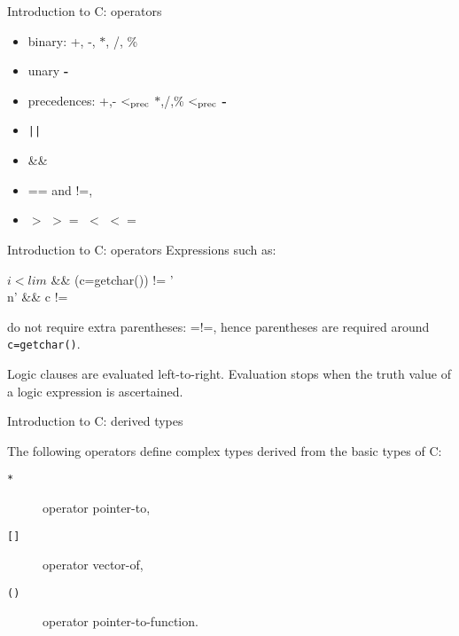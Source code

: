 \begin{frame}[fragile]{Introduction to C: operators}
\begin{itemize}
\item binary: +, -, $\ast$, /, \%
\item unary {\bf -}
\item precedences: +,- $<_{\rm prec}$ $\ast$,/,\% $<_{\rm prec}$ {\bf -}
\end{itemize}


\vspace{20pt}

\begin{itemize}
\item {\tt ||} \pre
\item \&\& \pre
\item == and !=, \pre
\item $>$ $>=$ $<$ $<=$
\end{itemize}


\end{frame}
\begin{frame}[fragile]{Introduction to C: operators}
Expressions such as:

\vspace{20pt}

\begin{center}
$i<lim$ \&\& (c=getchar()) != '\\n' \&\& c != \EOF
\end{center}
do not require extra parentheses:
 =\pre !=, hence parentheses are required around
\verb"c=getchar()".


\vspace{20pt}

Logic clauses are evaluated left-to-right. Evaluation stops when the truth value
of a logic expression is ascertained.



\end{frame}
\begin{frame}[fragile]{Introduction to C: derived types}

The following operators define complex types derived from the
basic types of C:

\vspace{20pt}

\begin{description}
\item[\texttt{*}] operator pointer-to,
\item[\texttt{[]}] operator vector-of,
\item[\texttt{()}] operator pointer-to-function.
\end{description}

\end{frame}
